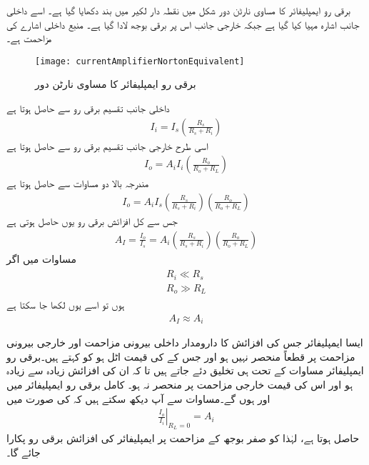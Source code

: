 برقی رو ایمپلیفائر کا مساوی نارٹن  دور شکل  میں نقطہ دار لکیر میں بند دکھایا گیا ہے۔ اسے داخلی جانب اشارہ  مہیا کیا گیا ہے جبکہ خارجی جانب اس پر برقی بوجھ  لادا گیا ہے۔ منبع داخلی اشارے کی مزاحمت  ہے۔
\begin{figure}
\centering
\texttt{[image: currentAmplifierNortonEquivalent]}
\caption{برقی رو ایمپلیفائر کا مساوی نارٹن دور}
\label{شکل_واپسی_رو_ایمپلیفائر_نارٹن_مساوی}
\end{figure}
داخلی جانب تقسیم برقی رو سے حاصل ہوتا ہے
\begin{align}
I_i = I_s  \left (\frac{R_s}{R_s+R_i} \right )
\end{align}
اسی طرح خارجی جانب تقسیم برقی رو سے حاصل ہوتا ہے
\begin{align} \label{مساوات_واپسی_رو_ایمپلیفائر_کی_خارجی_رو}
I_o = A_i I_i \left (\frac{R_o}{R_o+R_L} \right )
\end{align}
مندرجہ بالا دو مساوات سے حاصل ہوتا ہے
\begin{align}
I_o = A_i  I_s \left (\frac{R_s}{R_s+R_i} \right )  \left(\frac{R_o}{R_o+R_L} \right)
\end{align}
جس سے کل افزائش برقی رو  یوں حاصل ہوتی ہے
\begin{align} \label{مساوات_واپسی_رو_ایمپلیفائر_کی_افزائش}
A_I = \frac{I_o}{I_s}=A_i \left(\frac{R_s}{R_s+R_i} \right)  \left (\frac{R_o}{R_o+R_L} \right)
\end{align}
مساوات  میں اگر 
\begin{gather} \label{مساوات_واپسی_رو_ایمپلیفائر_کے_مزاحمت_کی_شرط}
\begin{aligned}
R_i \ll R_s \\
R_o \gg R_L
\end{aligned}
\end{gather}
ہوں تو اسے یوں لکھا جا سکتا ہے
\begin{align} \label{مساوات_واپسی_کامل_رو_ایمپلیفائر_کی_افزائش}
A_I  \approx A_i 
\end{align}

ایسا ایمپلیفائر جس کی افزائش  کا دارومدار داخلی بیرونی مزاحمت  اور خارجی بیرونی مزاحمت  پر قطعاً منحصر نہیں ہو اور جس کے  کی قیمت اٹل ہو کو  کہتے ہیں۔برقی رو ایمپلیفائر مساوات  کے تحت ہی تخلیق دئے جاتے ہیں تا کہ ان کی افزائش زیادہ سے زیادہ ہو اور اس کی قیمت خارجی مزاحمت  پر منحصر نہ ہو۔ کامل برقی رو ایمپلیفائر میں  اور  ہوں گے۔مساوات  سے آپ دیکھ سکتے ہیں کہ  کی صورت میں 
\begin{align} \label{مساوات_واپسی_صفر_بار_مزاحمت_پر_رو_کی_افزائش}
\left . \frac{I_o}{I_i} \right|_{R_L=0}=A_i
\end{align}
حاصل ہوتا ہے، لہٰذا  کو صفر بوجھ کے مزاحمت پر ایمپلیفائر کی افزائش برقی رو پکارا جائے گا۔


